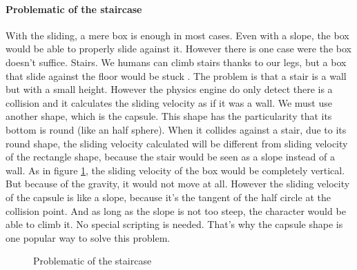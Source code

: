 \documentclass[10pt,a4paper]{article}
\begin{document}
\paragraph{Problematic of the staircase}
With the sliding, a mere box is enough in most cases. Even with a slope, the box would be able to properly slide against it. However there is one case were the box doesn't suffice. Stairs. We humans can climb stairs thanks to our legs, but a box that slide against the floor would be stuck . The problem is that a stair is a wall but with a small height. However the physics engine do only detect there is a collision and it calculates the sliding velocity as if it was a wall. We must use another shape, which is the capsule. This shape has the particularity that its bottom is round (like an half sphere). When it collides against a stair, due to its round shape, the sliding velocity calculated will be different from sliding velocity of the rectangle shape, because the stair would be seen as a slope instead of a wall. As in figure \ref{fig:stair_problematic_1}, the sliding velocity of the box would be completely vertical. But because of the gravity, it would not move at all. However the sliding velocity of the capsule is like a slope, because it's the tangent of the half circle at the collision point. And as long as the slope is not too steep, the character would be able to climb it. No special scripting is needed. That's why the capsule shape is one popular way to solve this problem.

\begin{figure}[h]
\centering
{}
\caption{Problematic of the staircase}
\label{fig:stair_problematic_1}
\end{figure}
\end{document}
